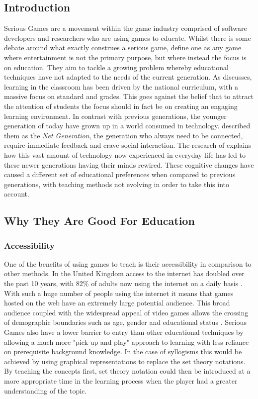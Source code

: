 \documentclass[12pt,a4paper]{report}
\begin{document}
\subsection{Introduction}
Serious Games are a movement within the game industry comprised of software developers and researchers who are using games to educate. Whilst there is some debate around what exactly construes a serious game, \cite{michael2005serious} define one as any game where entertainment is not the primary purpose, but where instead the focus is on education. They aim to tackle a growing problem whereby educational techniques have not adapted to the needs of the current generation. As \cite{lim2008spirit} discusses, learning in the classroom has been driven by the national curriculum, with a massive focus on standard and grades. This goes against the belief that to attract the attention of students the focus should in fact be on creating an engaging learning environment. In contrast with previous generations, the younger generation of today have grown up in a world consumed in technology. \cite{oblinger2005educating} described them as the \textit{Net Generation}, the generation who always need to be connected, require immediate feedback and crave social interaction. The research of \cite{prensky2001games} explains how this vast amount of technology now experienced in everyday life has led to these newer generations having their minds rewired. These cognitive changes have caused a different set of educational preferences when compared to previous generations, with teaching methods not evolving in order to take this into account.

\subsection{Why They Are Good For Education}
\subsubsection{Accessibility}
One of the benefits of using games to teach is their accessibility in comparison to other methods. In the United Kingdom  access to the internet has doubled over the past 10 years, with 82\% of adults now using the internet on a daily basis \citep{onssurvey}. With such a huge number of people using the internet it means that games hosted on the web have an extremely large potential audience. This broad audience coupled with the widespread appeal of video games allows the crossing of demographic boundaries such as age, gender and educational status \citep{griffiths2002educational}.  Serious Games also have a lower barrier to entry than other educational techniques by allowing a much more "pick up and play" approach to learning with less reliance on prerequisite background knowledge. In the case of syllogisms this would be achieved by using graphical representations to replace the set theory notations. By teaching the concepts first, set theory notation could then be introduced at a more appropriate time in the learning process when the player had a greater understanding of the topic. 
\end{document}
